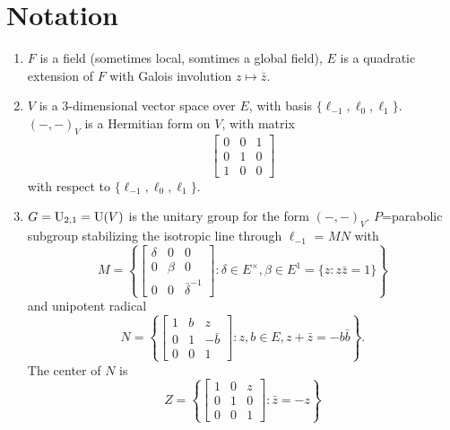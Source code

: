 \section*{Notation}
\label{sec:notation}

\begin{enumerate}[label=(\roman*)]
    \item $F$ is a field (sometimes local, somtimes a global field), $E$ is a quadratic extension of $F$ with Galois involution $z\mapsto \bar{z}$.
    \item $V$ is a 3-dimensional vector space over $E$, with basis $\{\ell_{-1}, \ell_{0}, \ell_{1}\}$. $(-,-)_V$ is a Hermitian form on $V$, with matrix
    \[
        \begin{bmatrix} 0 & 0& 1 \\ 0 & 1 & 0 \\ 1 & 0 & 0\end{bmatrix}
    \]
    with respect to $\{\ell_{-1}, \ell_{0}, \ell_{1}\}$.
    \item $G = \mathrm{U}_{2, 1} =\mathrm{U}(V)$ is the unitary group for the form $(-, -)_V$. $P$=parabolic subgroup stabilizing the isotropic line through $\ell_{-1}$ = $MN$ with
    \[
        M = \left\{\begin{bmatrix} \delta & 0 & 0 \\ 0 & \beta & 0 \\ 0 & 0 & \bar{\delta}^{-1} \end{bmatrix}: \delta \in E^\times, \beta \in E^{1} = \{z: z\bar{z} = 1\}\right\}
    \]
    and unipotent radical
    \[
        N = \left\{\begin{bmatrix} 1 & b& z \\ 0 & 1& -\bar{b} \\ 0 & 0 & 1\end{bmatrix}: z, b \in E, z + \bar{z} = -b\bar{b}\right\}.
    \]
    The center of $N$ is
    \[
        Z = \left\{\begin{bmatrix}
        1 & 0 & z \\ 0 & 1& 0 \\ 0 & 0 & 1          
        \end{bmatrix}: \bar{z} = -z\right\}
    \]
\end{enumerate}


